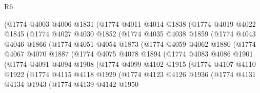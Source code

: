 \begin{lexlean}{R6}
\begin{coremodule}
            (@1774
              @4003
              @4006
              @1831
              (@1774
                @4011
                @4014
                @1838
                (@1774
                  @4019
                  @4022
                  @1845
                  (@1774
                    @4027
                    @4030
                    @1852
                    (@1774
                      @4035
                      @4038
                      @1859
                      (@1774
                        @4043
                        @4046
                        @1866
                        (@1774
                          @4051
                          @4054
                          @1873
                          (@1774
                            @4059
                            @4062
                            @1880
                            (@1774
                              @4067
                              @4070
                              @1887
                              (@1774
                                @4075
                                @4078
                                @1894
                                (@1774
                                  @4083
                                  @4086
                                  @1901
                                  (@1774
                                    @4091
                                    @4094
                                    @1908
                                    (@1774
                                      @4099
                                      @4102
                                      @1915
                                      (@1774
                                        @4107
                                        @4110
                                        @1922
                                        (@1774
                                          @4115
                                          @4118
                                          @1929
                                          (@1774
                                            @4123
                                            @4126
                                            @1936
                                            (@1774
                                              @4131
                                              @4134
                                              @1943
                                              (@1774
                                                @4139
                                                @4142
                                                @1950

\end{coremodule}
\end{lexlean}
